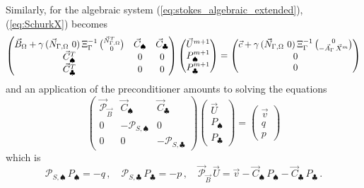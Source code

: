 Similarly, for the algebraic system (\ref{eq:stokes_algebraic_extended}),
(\ref{eq:SchurkX}) becomes
\begin{subequations}
\begin{equation} \label{eq:SchurkXP1P0}
\begin{pmatrix}
\vec B_\Omega + \gamma\,(\Nbulk \ 0)\,\Xi_\Gamma^{-1}\,\binom{\NbulkT}{0} &
\vec C_\spadesuit & \vec C_\clubsuit \\
\vec C^T_\spadesuit & 0 & 0 \\
\vec C^T_\clubsuit & 0 & 0 \\
\end{pmatrix}
\begin{pmatrix}
\vec U^{m+1} \\
P^{m+1}_\spadesuit \\
P^{m+1}_\clubsuit
\end{pmatrix}
= \begin{pmatrix}
\vec c+\gamma\,(\Nbulk \ 0)\,
\Xi_\Gamma^{-1}\,\binom{0}{-\vec{A}_\Gamma\,\vec{X}^{m}} \\
0 \\
0
\end{pmatrix}
\end{equation}
\end{subequations}
and an application of the preconditioner amounts to solving the equations
\begin{equation*}
\begin{pmatrix}
\vec{\mathcal{P}}_{\vec B} & \vec C_\spadesuit & \vec C_\clubsuit \\
0 & -\mathcal{P}_{S,\spadesuit} & 0 \\
0 & 0 &-\mathcal{P}_{S,\clubsuit}
\end{pmatrix}
\begin{pmatrix}
\vec U \\
P_\spadesuit \\
P_\clubsuit
\end{pmatrix}
=
\begin{pmatrix}
\vec v \\
q \\
p
\end{pmatrix}
\end{equation*}
which is
\begin{equation*}
\mathcal{P}_{S,\spadesuit}\,P_\spadesuit =
-q\,,\quad \mathcal{P}_{S,\clubsuit}\,P_\clubsuit =
-p\,,\quad \vec{\mathcal{P}}_{\vec B}\,\vec U =
\vec v - \vec C_\spadesuit\,P_\spadesuit - \vec C_\clubsuit\,P_\clubsuit\,.
\end{equation*}

